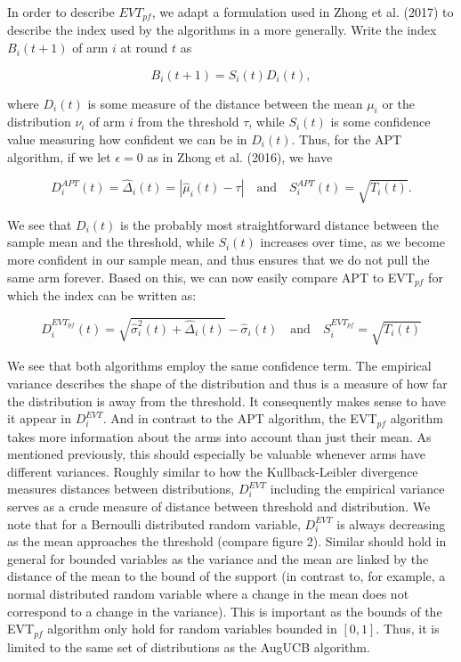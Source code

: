 \documentclass[11pt,]{article}
\begin{document}
In order to describe \(EVT_{pf}\), we adapt a formulation used in Zhong
et al. (2017) to describe the index used by the algorithms in a more
generally. Write the index \(B_i(t+1)\) of arm \(i\) at round \(t\) as

\[
B_i(t+1) = S_i(t) D_i(t),
\]

where \(D_i(t)\) is some measure of the distance between the mean
\(\mu_i\) or the distribution \(\nu_i\) of arm \(i\) from the threshold
\(\tau\), while \(S_i(t)\) is some confidence value measuring how
confident we can be in \(D_i(t)\). Thus, for the APT algorithm, if we
let \(\epsilon = 0\) as in Zhong et al. (2016), we have

\[
D_i^{APT}(t) = \hat{\Delta}_i(t) = |\hat{\mu}_i(t) - \tau| \quad \text{and} \quad S_i^{APT}(t) = \sqrt{T_i(t)}.
\]

We see that \(D_i(t)\) is the probably most straightforward distance
between the sample mean and the threshold, while \(S_i(t)\) increases
over time, as we become more confident in our sample mean, and thus
ensures that we do not pull the same arm forever. Based on this, we can
now easily compare APT to EVT\(_{pf}\) for which the index can be
written as:

\[
D_i^{EVT_{pf}}(t) = \sqrt{\hat{\sigma}^2_{i}(t) + \hat{\Delta}_i(t)} - \hat{\sigma}_i(t) \quad \text{and} \quad S_i^{EVT_{pf}} = \sqrt{T_i(t)}
\]

We see that both algorithms employ the same confidence term. The
empirical variance describes the shape of the distribution and thus is a
measure of how far the distribution is away from the threshold. It
consequently makes sense to have it appear in \(D_i^{EVT}\). And in
contrast to the APT algorithm, the EVT\(_{pf}\) algorithm takes more
information about the arms into account than just their mean. As
mentioned previously, this should especially be valuable whenever arms
have different variances. Roughly similar to how the Kullback-Leibler
divergence measures distances between distributions, \(D_i^{EVT}\)
including the empirical variance serves as a crude measure of distance
between threshold and distribution. We note that for a Bernoulli
distributed random variable, \(D_i^{EVT}\) is always decreasing as the
mean approaches the threshold (compare figure 2). Similar should hold in
general for bounded variables as the variance and the mean are linked by
the distance of the mean to the bound of the support (in contrast to,
for example, a normal distributed random variable where a change in the
mean does not correspond to a change in the variance). This is important
as the bounds of the EVT\(_{pf}\) algorithm only hold for random
variables bounded in \([0,1]\). Thus, it is limited to the same set of
distributions as the AugUCB algorithm.
\end{document}
